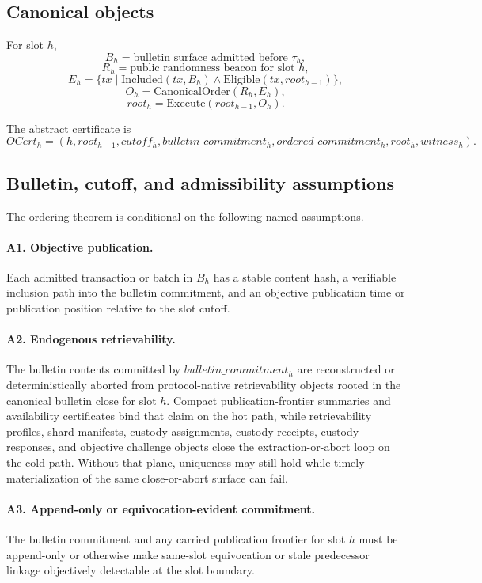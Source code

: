 \documentclass[11pt]{article}
\newcommand{\suchthat}{\;|\;}
\begin{document}
\subsection{Canonical objects}

For slot \(h\),
\[
B_h = \text{bulletin surface admitted before }\tau_h,
\]
\[
R_h = \text{public randomness beacon for slot }h,
\]
\[
E_h = \{tx \suchthat \mathrm{Included}(tx, B_h) \wedge \mathrm{Eligible}(tx, root_{h-1})\},
\]
\[
O_h = \mathrm{CanonicalOrder}(R_h, E_h),
\]
\[
root_h = \mathrm{Execute}(root_{h-1}, O_h).
\]

The abstract certificate is
\[
OCert_h =
\left(
  h,
  root_{h-1},
  cutoff_h,
  bulletin\_commitment_h,
  ordered\_commitment_h,
  root_h,
  witness_h
\right).
\]

\subsection{Bulletin, cutoff, and admissibility assumptions}

The ordering theorem is conditional on the following named assumptions.

\paragraph{A1. Objective publication.}
Each admitted transaction or batch in \(B_h\) has a stable content hash, a
verifiable inclusion path into the bulletin commitment, and an objective
publication time or publication position relative to the slot cutoff.

\paragraph{A2. Endogenous retrievability.}
The bulletin contents committed by \(bulletin\_commitment_h\) are reconstructed
or deterministically aborted from protocol-native retrievability objects rooted
in the canonical bulletin close for slot \(h\). Compact publication-frontier
summaries and availability certificates bind that claim on the hot path, while
retrievability profiles, shard manifests, custody assignments, custody
receipts, custody responses, and objective challenge objects close the
extraction-or-abort loop on the cold path.
Without that plane, uniqueness may still hold while timely materialization of
the same close-or-abort surface can fail.

\paragraph{A3. Append-only or equivocation-evident commitment.}
The bulletin commitment and any carried publication frontier for slot \(h\)
must be append-only or otherwise make same-slot equivocation or stale
predecessor linkage objectively detectable at the slot boundary.
\end{document}
